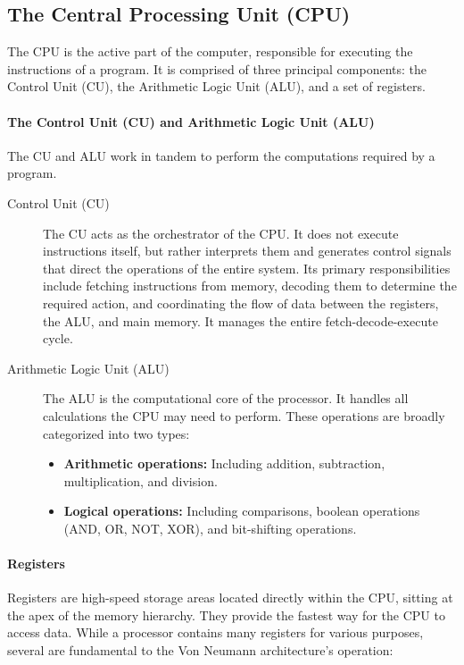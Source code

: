 \subsection*{The Central Processing Unit (CPU)}
The CPU is the active part of the computer, responsible for executing the instructions of a program. It is comprised of three principal components: the Control Unit (CU), the Arithmetic Logic Unit (ALU), and a set of registers.

\paragraph{The Control Unit (CU) and Arithmetic Logic Unit (ALU)}
The CU and ALU work in tandem to perform the computations required by a program.
\begin{description}
    \item[Control Unit (CU)] The CU acts as the orchestrator of the CPU. It does not execute instructions itself, but rather interprets them and generates control signals that direct the operations of the entire system. Its primary responsibilities include fetching instructions from memory, decoding them to determine the required action, and coordinating the flow of data between the registers, the ALU, and main memory. It manages the entire fetch-decode-execute cycle.
    
    \item[Arithmetic Logic Unit (ALU)] The ALU is the computational core of the processor. It handles all calculations the CPU may need to perform. These operations are broadly categorized into two types:
    \begin{itemize}
        \item \textbf{Arithmetic operations:} Including addition, subtraction, multiplication, and division.
        \item \textbf{Logical operations:} Including comparisons, boolean operations (AND, OR, NOT, XOR), and bit-shifting operations.
    \end{itemize}
\end{description}

\paragraph{Registers}
Registers are high-speed storage areas located directly within the CPU, sitting at the apex of the memory hierarchy. They provide the fastest way for the CPU to access data. While a processor contains many registers for various purposes, several are fundamental to the Von Neumann architecture's operation:

